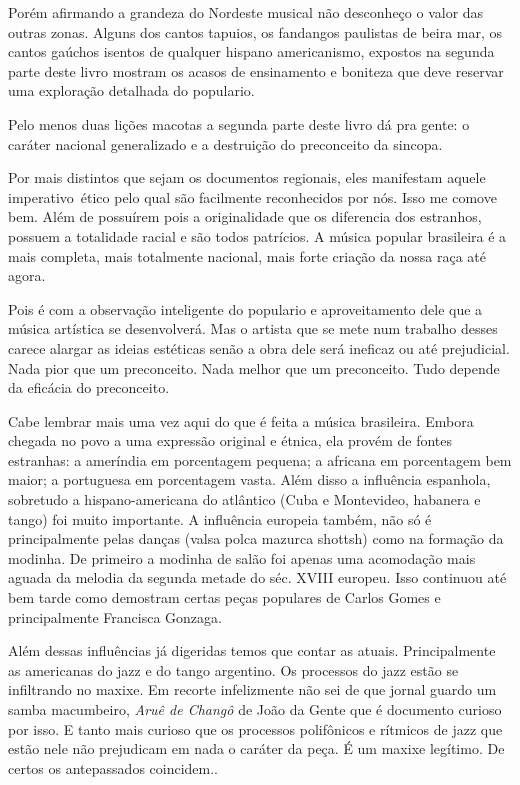 Porém afirmando a grandeza do Nordeste musical não desconheço o valor
das outras zonas. Alguns dos cantos tapuios, os fandangos paulistas de
beira mar, os cantos gaúchos isentos de qualquer hispano americanismo,
expostos na segunda parte deste livro mostram os acasos de ensinamento e
boniteza que deve reservar uma exploração detalhada do populario.~

Pelo menos duas lições macotas a segunda parte deste livro dá pra gente:
o caráter nacional generalizado e a destruição do preconceito da
sincopa.

Por mais distintos que sejam os documentos regionais, eles manifestam
aquele imperativo~ético pelo qual são facilmente reconhecidos por nós.
Isso me comove bem. Além de possuírem pois a originalidade que os
diferencia dos estranhos, possuem a totalidade racial e são todos
patrícios. A música popular brasileira é a mais completa, mais
totalmente nacional, mais forte criação da nossa raça até agora.~

Pois é com a observação inteligente do populario e aproveitamento dele
que a música artística se desenvolverá. Mas o artista que se mete num
trabalho desses carece alargar as ideias estéticas senão a obra dele
será ineficaz ou até prejudicial. Nada pior que um preconceito. Nada
melhor que um preconceito. Tudo depende da eficácia do preconceito.~

Cabe lembrar mais uma vez aqui do que é feita a música brasileira.
Embora chegada no povo a uma expressão original e étnica, ela provém de
fontes estranhas: a ameríndia em porcentagem pequena; a africana em
porcentagem bem maior; a portuguesa em porcentagem vasta. Além disso a
influência espanhola, sobretudo a hispano-americana do atlântico (Cuba e
Montevideo, habanera e tango) foi muito importante. A influência
europeia também, não só é principalmente pelas danças (valsa polca
mazurca shottsh) como na formação da modinha. De primeiro a modinha de
salão foi apenas uma acomodação mais aguada da melodia da segunda metade
do séc. XVIII europeu. Isso continuou até bem tarde como demostram
certas peças populares de Carlos Gomes e principalmente Francisca
Gonzaga.

Além dessas influências já digeridas temos que contar as atuais.
Principalmente as americanas do jazz e do tango argentino. Os processos
do jazz estão se infiltrando no maxixe. Em recorte infelizmente não sei
de que jornal guardo um samba macumbeiro, \emph{Aruê de Changô} de João
da Gente que é documento curioso por isso. E tanto mais curioso que os
processos polifônicos e rítmicos de jazz que estão nele não prejudicam
em nada o caráter da peça. É um maxixe legítimo. De certos os
antepassados coincidem..~

